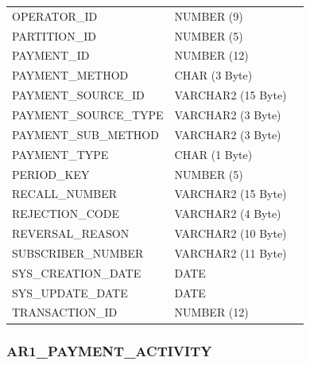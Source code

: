 \documentclass[12pt,twoside]{article}
\begin{document}
\begin{longtable}{lll}
 OPERATOR\_ID                   &  NUMBER (9)           &                        \\
 PARTITION\_ID                  &  NUMBER (5)           &                        \\
 PAYMENT\_ID                    &  NUMBER (12)          &                        \\
 PAYMENT\_METHOD                &  CHAR (3 Byte)        &                        \\
 PAYMENT\_SOURCE\_ID            &  VARCHAR2 (15 Byte)   &                        \\
 PAYMENT\_SOURCE\_TYPE          &  VARCHAR2 (3 Byte)    &                        \\
 PAYMENT\_SUB\_METHOD           &  VARCHAR2 (3 Byte)    &                        \\
 PAYMENT\_TYPE                  &  CHAR (1 Byte)        &                        \\
 PERIOD\_KEY                    &  NUMBER (5)           &                        \\
 RECALL\_NUMBER                 &  VARCHAR2 (15 Byte)   &                        \\
 REJECTION\_CODE                &  VARCHAR2 (4 Byte)    &                        \\
 REVERSAL\_REASON               &  VARCHAR2 (10 Byte)   &                        \\
 SUBSCRIBER\_NUMBER             &  VARCHAR2 (11 Byte)   &                        \\
 SYS\_CREATION\_DATE            &  DATE                 &                        \\
 SYS\_UPDATE\_DATE              &  DATE                 &                        \\
 TRANSACTION\_ID                &  NUMBER (12)          &                        \\
\hline
\end{longtable}

\normalsize
\subsubsection{AR1\_PAYMENT\_ACTIVITY}
\label{sec-11-6-11}
\end{document}
